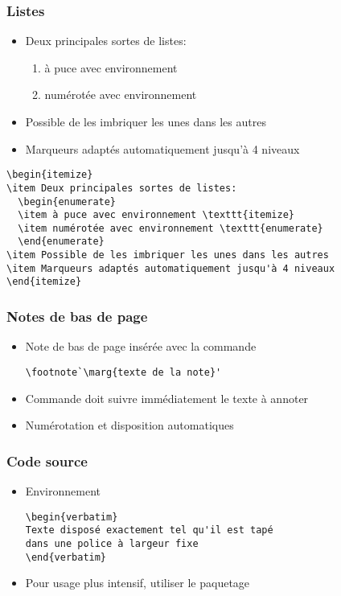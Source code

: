 \begin{frame}[fragile]
  \frametitle{Listes}
  \begin{itemize}
  \item Deux principales sortes de listes:
    \begin{enumerate}
    \item \alert{à puce} avec environnement 
    \item \alert{numérotée} avec environnement 
    \end{enumerate}
  \item Possible de les imbriquer les unes dans les autres
  \item Marqueurs adaptés automatiquement jusqu'à 4 niveaux
  \end{itemize}
  \pause

\begin{lstlisting}
\begin{itemize}
\item Deux principales sortes de listes:
  \begin{enumerate}
  \item à puce avec environnement \texttt{itemize}
  \item numérotée avec environnement \texttt{enumerate}
  \end{enumerate}
\item Possible de les imbriquer les unes dans les autres
\item Marqueurs adaptés automatiquement jusqu'à 4 niveaux
\end{itemize}
\end{lstlisting}
\end{frame}

\begin{frame}[fragile]
  \frametitle{Notes de bas de page}
  \begin{itemize}
  \item Note de bas de page insérée avec la commande
\begin{lstlisting}
\footnote`\marg{texte de la note}'
\end{lstlisting}
  \item Commande doit suivre immédiatement le texte à annoter
  \item Numérotation et disposition automatiques
  \end{itemize}
\end{frame}

\begin{frame}[fragile=singleslide]
  \frametitle{Code source}
  \begin{itemize}
  \item Environnement 
\begin{lstlisting}
\begin{verbatim}
Texte disposé exactement tel qu'il est tapé
dans une police à largeur fixe
\end{verbatim}
\end{lstlisting}
  \item Pour usage plus intensif, utiliser le paquetage 
  \end{itemize}
\end{frame}

